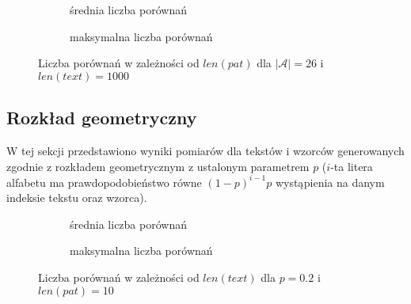 \begin{figure}[htb]
    \centering
    \begin{subfigure}[b]{0.49\textwidth}
        \centering
        
        \caption{średnia liczba porównań}
        \label{fig:result_alph_uni_26_text_1000_plot_avg_100}
    \end{subfigure}
    \hfill
    \begin{subfigure}[b]{0.49\textwidth}
        \centering
        
        \caption{maksymalna liczba porównań}
        \label{fig:result_alph_uni_26_text_1000_plot_max_100}
    \end{subfigure}
    \hfill
    \caption{Liczba porównań w zależności od $len(pat)$ dla $|\mathcal{A}| = 26$ i $len(text) = 1000$}
    \label{fig:result_alph_uni_26_text_1000}
\end{figure}

\FloatBarrier
\subsection{Rozkład geometryczny}
W tej sekcji przedstawiono wyniki pomiarów dla tekstów i wzorców generowanych zgodnie z rozkładem geometrycznym z ustalonym parametrem $p$ ($i$-ta litera alfabetu ma prawdopodobieństwo równe $(1-p)^{i-1}p$ wystąpienia na danym indeksie tekstu oraz wzorca).

\begin{figure}[htb]
    \centering
    \begin{subfigure}[b]{0.49\textwidth}
        \centering
        
        \caption{średnia liczba porównań}
        \label{fig:result_alph_geo_02_pat_10_plot_avg_100}
    \end{subfigure}
    \hfill
    \begin{subfigure}[b]{0.49\textwidth}
        \centering
        
        \caption{maksymalna liczba porównań}
        \label{fig:result_alph_geo_02_pat_10_plot_max_100}
    \end{subfigure}
    \hfill
    \caption{Liczba porównań w zależności od $len(text)$ dla $p = 0.2$ i $len(pat) = 10$}
    \label{fig:result_alph_geo_02_pat_10}
\end{figure}

